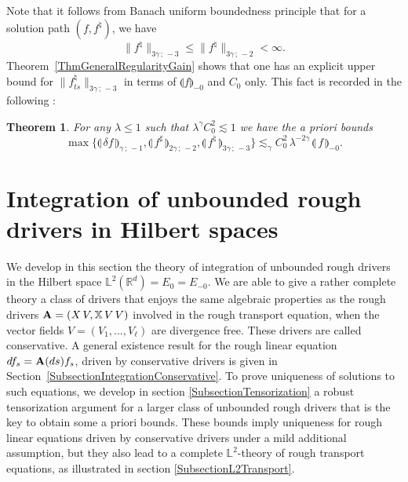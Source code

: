 \documentclass[11pt,a4paper]{amsart}
\newcommand{\RR}{\mathbb{R}}  \newcommand{\CC}{\mathbb{C}}  \newcommand{\LL}{\mathbb{L}}  \newcommand{\WW}{\mathbb{W}}
\newcommand{\bbX}{\mathbb{X}}
\renewcommand{\leq}{\leqslant}
\theoremstyle{plain}%
\newtheorem{theorem}{Theorem}
\theoremstyle{definition}
\theoremstyle{remark}
\numberwithin{equation}{section} %
\begin{document}
Note that it follows from Banach uniform boundedness principle that for a solution path $(f,f^\natural)$, we have
$$
\| f^\natural\|_{3\gamma\,;\,-3} \leq \| f^\natural\|_{3\gamma\,;\,-2} < \infty.
$$
Theorem~\ref{ThmGeneralRegularityGain} shows that one has an explicit upper bound for $\| f^\natural_{ts}\|_{3\gamma\,;\,-3}$ in terms of $ \llparenthesis f\rrparenthesis_{-0}$ and $C_0$ only. This fact is recorded in the following :

\begin{theorem}
\label{ThmRegularityGain} 
For any $\lambda \leq 1$ such that $\lambda^\gamma C_0^2 \lesssim 1$ we have the a priori bounds
\begin{equation}
\label{EqFundamentalAPrioriEstimate}
\max\{  \llparenthesis\, \delta f \,\rrparenthesis_{\gamma\,;\, - 1} , \llparenthesis\, f^\sharp \,\rrparenthesis_{2 \gamma\,;\, - 2}, \llparenthesis\, f^\natural \,\rrparenthesis_{3 \gamma\,;\, - 3} \} \lesssim_{\gamma} C_0^2\,\lambda^{-2\gamma}\,\llparenthesis\, f\,\rrparenthesis_{-0} .
\end{equation}
\end{theorem}

\medskip


\section{Integration of unbounded rough drivers in Hilbert spaces}
\label{SectionHilbertSpaceTheory}

We develop in this section the theory of integration of unbounded rough drivers in the Hilbert space $\LL^2(\RR^d)=E_0=E_{-0}$. We are able to give a rather complete theory a class of drivers that enjoys the same algebraic properties as the rough drivers ${\bfA} = (X\,V,\bbX\,V\,V)$ involved in the rough transport equation, when the vector fields $V=(V_1,\dots,V_\ell)$ are divergence free. These drivers are called conservative. A general existence result for the rough linear equation $df_s = {\bf A}(ds)f_s$, driven by conservative drivers is given in Section~\ref{SubsectionIntegrationConservative}. To prove uniqueness of solutions to such equations, we develop in section \eqref{SubsectionTensorization} a robust tensorization argument for a larger class of unbounded rough drivers that is the key to obtain some a priori bounds. These bounds imply uniqueness for rough linear equations driven by conservative drivers under a mild additional assumption, but they also lead to a complete $\LL^2$-theory of rough transport equations, as illustrated in section \eqref{SubsectionL2Transport}.
\end{document}
